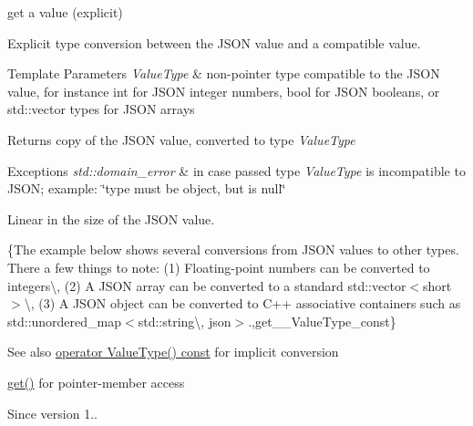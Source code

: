 get a value (explicit) 

Explicit type conversion between the J\+S\+ON value and a compatible value.


\begin{DoxyTemplParams}{Template Parameters}
{\em Value\+Type} & non-\/pointer type compatible to the J\+S\+ON value, for instance {\ttfamily int} for J\+S\+ON integer numbers, {\ttfamily bool} for J\+S\+ON booleans, or {\ttfamily std\+::vector} types for J\+S\+ON arrays\\
\hline
\end{DoxyTemplParams}
\begin{DoxyReturn}{Returns}
copy of the J\+S\+ON value, converted to type {\itshape Value\+Type} 
\end{DoxyReturn}

\begin{DoxyExceptions}{Exceptions}
{\em std\+::domain\+\_\+error} & in case passed type {\itshape Value\+Type} is incompatible to J\+S\+ON; example\+: {\ttfamily \char`\"{}type must be object, but is null\char`\"{}}\\
\hline
\end{DoxyExceptions}
Linear in the size of the J\+S\+ON value.

\{The example below shows several conversions from J\+S\+ON values to other types. There a few things to note\+: (1) Floating-\/point numbers can be converted to integers\textbackslash{}, (2) A J\+S\+ON array can be converted to a standard {\ttfamily std\+::vector$<$short$>$}\textbackslash{}, (3) A J\+S\+ON object can be converted to C++ associative containers such as {\ttfamily std\+::unordered\+\_\+map$<$std\+::string\textbackslash{}, json$>$}.,get\+\_\+\+\_\+\+Value\+Type\+\_\+const\}

\begin{DoxySeeAlso}{See also}
\hyperlink{classnlohmann_1_1basic__json_ac5bed64638180098b5db82f8e482d855}{operator Value\+Type() const} for implicit conversion 

\hyperlink{classnlohmann_1_1basic__json_ac5693cff1df0775cd3fbe960412cde4b}{get()} for pointer-\/member access
\end{DoxySeeAlso}
\begin{DoxySince}{Since}
version 1.. 
\end{DoxySince}
\hypertarget{classnlohmann_1_1basic__json_ac5693cff1df0775cd3fbe960412cde4b}{}\label{classnlohmann_1_1basic__json_ac5693cff1df0775cd3fbe960412cde4b} 
